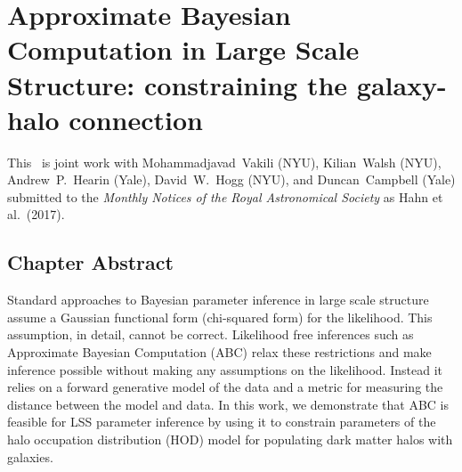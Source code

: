 %
%
%
\renewcommand{\chapid}{abc}

\chapter{Approximate Bayesian Computation in Large Scale Structure: constraining the galaxy-halo connection }

This \paper\ is joint work with Mohammadjavad~Vakili (NYU), Kilian~Walsh (NYU), 
Andrew~P.~Hearin (Yale), David~W.~Hogg (NYU), and Duncan~Campbell (Yale)  
submitted to the \emph{Monthly Notices of the Royal Astronomical Society} as Hahn et al.\ (2017).

\newcommand{\lang}{\langle}
\newcommand{\ra}{\rangle}
\newcommand{\vep}{\bm{\epsilon}}
\newcommand{\ep}{\epsilon}
\newcommand{\pars}{\vec{\theta}}
\newcommand{\dev}{\mathrm{d}}
\newcommand{\mstar}{h^{-1}M_\odot}

\section{Chapter Abstract}
Standard approaches to Bayesian parameter inference in large scale 
structure assume a Gaussian functional form (chi-squared form) 
for the likelihood. This assumption, in detail, cannot %
be correct. Likelihood free inferences such as Approximate Bayesian Computation (ABC) 
relax these restrictions and make inference possible without making any 
assumptions on the likelihood.
Instead it relies on a forward generative model of the data and a metric 
for measuring the distance between the model and data. In this work, we 
demonstrate that ABC is feasible for LSS parameter inference by using it 
to constrain parameters of the halo occupation distribution (HOD) model 
for populating dark matter halos with galaxies.

